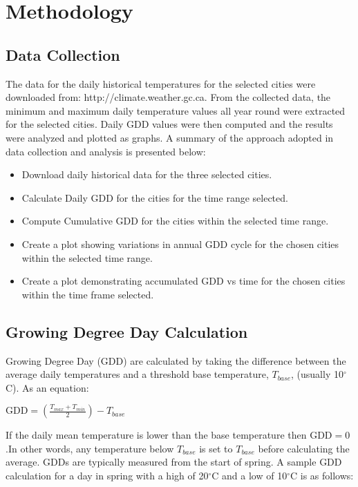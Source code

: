 \documentclass{article}
\begin{document}
\section{ \bf Methodology}
\subsection{Data Collection}
The data for the daily historical temperatures for the selected cities were downloaded from: http://climate.weather.gc.ca. From the collected data, the minimum and maximum daily temperature values all year round were extracted for the selected cities. Daily GDD values were then computed and the results were analyzed and plotted as graphs. A summary of the approach adopted in data collection and analysis is presented below:

\begin{itemize}
\item Download daily historical data for the three selected cities. 
\item Calculate Daily GDD for the cities for the time range selected. 
\item Compute Cumulative GDD for the cities within the selected time range.
\item Create a plot showing variations in annual GDD cycle for the chosen cities within the selected time range. 
\item Create a plot demonstrating accumulated GDD vs time for the chosen cities within the time frame selected. 
\end{itemize}

\subsection{Growing Degree Day Calculation}
Growing Degree Day (GDD) are calculated by taking the difference between the average daily temperatures and a threshold base temperature, $T_{base}$, (usually 10$^{\circ}$C). As an equation: \vspace{5mm}

{\centering
$\textrm{GDD} = \left(\frac{T_{max} + T_{min}}{2}\right) - T_{base}$\\ [\baselineskip]
}

\noindent If the daily mean temperature is lower than the base temperature then $\textrm{GDD} = 0$.In other words, any temperature below $T_{base}$ is set to $T_{base}$ before calculating the average. GDDs are typically measured from the start of spring. A sample GDD calculation for a day in spring with a high of 20$^{\circ}$C and a low of 10$^{\circ}$C is as follows:\vspace{5mm}
\end{document}
